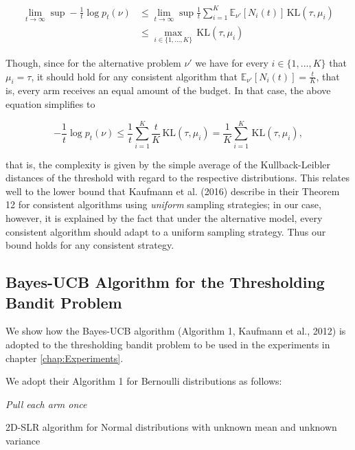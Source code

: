 \documentclass[11pt,]{article}
\newcommand{\KL}{\,\text{KL}}
\begin{document}
\begin{align*}
\lim_{t \rightarrow \infty} \sup - \frac{1}{t} \log p_t(\nu) & \leq \lim_{t \rightarrow \infty} \sup \frac{1}{t} \sum_{i=1}^K \mathbb{E}_{\nu'}[N_i(t)]\KL(\tau, \mu_i) \\
& \leq \max_{i \in \{1,...,K\}} \KL(\tau, \mu_i)
\end{align*}

Though, since for the alternative problem \(\nu'\) we have for every
\(i \in \{1,...,K\}\) that \(\mu_i = \tau\), it should hold for any
consistent algorithm that \(\mathbb{E}_{\nu'}[N_i(t)] = \frac{t}{K}\),
that is, every arm receives an equal amount of the budget. In that case,
the above equation simplifies to

\[
- \frac{1}{t} \log p_t(\nu) \leq \frac{1}{t} \sum_{i=1}^K \frac{t}{K}\KL(\tau, \mu_i) = \frac{1}{K} \sum_{i=1}^{K} \KL(\tau, \mu_i),
\]

that is, the complexity is given by the simple average of the
Kullback-Leibler distances of the threshold with regard to the
respective distributions. This relates well to the lower bound that
Kaufmann et al. (2016) describe in their Theorem 12 for consistent
algorithms using \emph{uniform} sampling strategies; in our case,
however, it is explained by the fact that under the alternative model,
every consistent algorithm should adapt to a uniform sampling strategy.
Thus our bound holds for any consistent strategy.

\subsection{\texorpdfstring{Bayes-UCB Algorithm for the Thresholding
Bandit Problem
\label{sec:AppendixBUCB}}{Bayes-UCB Algorithm for the Thresholding Bandit Problem }}\label{bayes-ucb-algorithm-for-the-thresholding-bandit-problem}

We show how the Bayes-UCB algorithm (Algorithm 1, Kaufmann et al., 2012)
is adopted to the thresholding bandit problem to be used in the
experiments in chapter \autoref{chap:Experiments}.

We adopt their Algorithm 1 for Bernoulli distributions as follows:

\IncMargin{1em}

\begin{algorithm}
\BlankLine
\emph{Pull each arm once}\;
\caption{2D-SLR algorithm for Normal distributions with unknown mean and unknown variance}\label{algo_slr_2d}
\end{algorithm}
\end{document}
